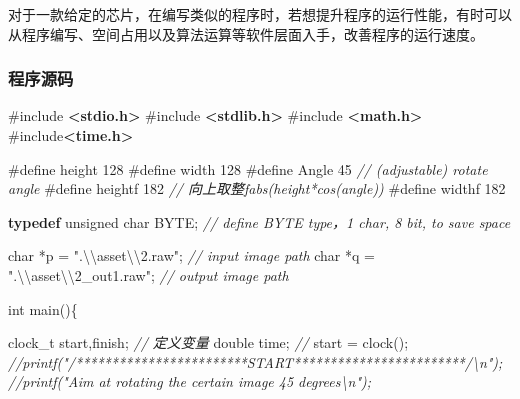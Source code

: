 \documentclass[
]{article}
\newenvironment{Shaded}{}{}
\newcommand{\CommentTok}[1]{\textcolor[rgb]{0.38,0.63,0.69}{\textit{#1}}}
\newcommand{\DataTypeTok}[1]{\textcolor[rgb]{0.56,0.13,0.00}{#1}}
\newcommand{\ImportTok}[1]{\textcolor[rgb]{0.00,0.50,0.00}{\textbf{#1}}}
\newcommand{\KeywordTok}[1]{\textcolor[rgb]{0.00,0.44,0.13}{\textbf{#1}}}
\newcommand{\NormalTok}[1]{#1}
\newcommand{\OperatorTok}[1]{\textcolor[rgb]{0.40,0.40,0.40}{#1}}
\newcommand{\PreprocessorTok}[1]{\textcolor[rgb]{0.74,0.48,0.00}{#1}}
\newcommand{\SpecialCharTok}[1]{\textcolor[rgb]{0.25,0.44,0.63}{#1}}
\newcommand{\StringTok}[1]{\textcolor[rgb]{0.25,0.44,0.63}{#1}}
\begin{document}
对于一款给定的芯片，在编写类似的程序时，若想提升程序的运行性能，有时可以从程序编写、空间占用以及算法运算等软件层面入手，改善程序的运行速度。

\hypertarget{ux7a0bux5e8fux6e90ux7801}{%
\subsubsection{程序源码}\label{ux7a0bux5e8fux6e90ux7801}}

\begin{Shaded}
\begin{Highlighting}[]
\PreprocessorTok{\#include }\ImportTok{\textless{}stdio.h\textgreater{}}
\PreprocessorTok{\#include }\ImportTok{\textless{}stdlib.h\textgreater{}}
\PreprocessorTok{\#include }\ImportTok{\textless{}math.h\textgreater{}}
\PreprocessorTok{\#include}\ImportTok{\textless{}time.h\textgreater{}}\PreprocessorTok{ }

\PreprocessorTok{\#define height  128    }
\PreprocessorTok{\#define width   128 }
\PreprocessorTok{\#define Angle   45                  }\CommentTok{// (adjustable) rotate angle}
\PreprocessorTok{\#define heightf 182                 }\CommentTok{// 向上取整fabs(height*cos(angle)) }
\PreprocessorTok{\#define widthf  182                 }

\KeywordTok{typedef} \DataTypeTok{unsigned} \DataTypeTok{char}\NormalTok{  BYTE}\OperatorTok{;}        \CommentTok{// define BYTE type，1 char, 8 bit, to save space}

\DataTypeTok{char} \OperatorTok{*}\NormalTok{p }\OperatorTok{=} \StringTok{".}\SpecialCharTok{\textbackslash{}\textbackslash{}}\StringTok{asset}\SpecialCharTok{\textbackslash{}\textbackslash{}}\StringTok{2.raw"}\OperatorTok{;}        \CommentTok{// input image path}
\DataTypeTok{char} \OperatorTok{*}\NormalTok{q }\OperatorTok{=} \StringTok{".}\SpecialCharTok{\textbackslash{}\textbackslash{}}\StringTok{asset}\SpecialCharTok{\textbackslash{}\textbackslash{}}\StringTok{2\_out1.raw"}\OperatorTok{;}    \CommentTok{// output image path}

\DataTypeTok{int}\NormalTok{ main}\OperatorTok{()\{}
    
\NormalTok{    clock\_t start}\OperatorTok{,}\NormalTok{finish}\OperatorTok{;} \CommentTok{// 定义变量}
    \DataTypeTok{double}\NormalTok{ time}\OperatorTok{;}            \CommentTok{// }
\NormalTok{    start }\OperatorTok{=}\NormalTok{ clock}\OperatorTok{();} 
    \CommentTok{//printf("/************************START************************/\textbackslash{}n");}
    \CommentTok{//printf("Aim at rotating the certain image 45 degrees\textbackslash{}n");}
    

\end{Highlighting}
\end{Shaded}
\end{document}
